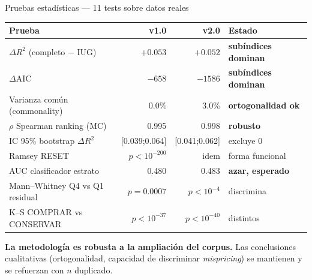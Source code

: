 \documentclass[aspectratio=169,11pt]{beamer}
\newcommand{\hi}[1]{\textcolor{inmuGreen}{\textbf{#1}}}
\begin{document}
\begin{frame}{Pruebas estadísticas --- 11 tests sobre datos reales}
  \footnotesize
  \begin{center}
  \begin{tabular}{lrrl}
    \toprule
    \textbf{Prueba} & \textbf{v1.0} & \textbf{v2.0} & \textbf{Estado} \\
    \midrule
    $\Delta R^2$ (completo $-$ IUG)            & $+0.053$ & $+0.052$ & \hi{subíndices dominan} \\
    $\Delta$AIC                                & $-658$   & $-1586$  & \hi{subíndices dominan} \\
    Varianza común (commonality)               & 0.0\%    & 3.0\%    & \hi{ortogonalidad ok} \\
    $\rho$ Spearman ranking (MC)               & 0.995    & 0.998    & \hi{robusto} \\
    IC 95\% bootstrap $\Delta R^2$             & [0.039;0.064] & [0.041;0.062] & excluye 0 \\
    Ramsey RESET                               & $p < 10^{-200}$ & idem & forma funcional \\
    AUC clasificador estrato                   & 0.480    & 0.483    & \hi{azar, esperado} \\
    Mann--Whitney Q4 vs Q1 residual            & $p=0.0007$ & $p<10^{-4}$ & discrimina \\
    K--S COMPRAR vs CONSERVAR                  & $p<10^{-37}$ & $p<10^{-40}$ & distintos \\
    \bottomrule
  \end{tabular}
  \end{center}
  \vspace{0.4em}
  \footnotesize
  \hi{La metodología es robusta a la ampliación del corpus.} Las
  conclusiones cualitativas (ortogonalidad, capacidad de discriminar
  \emph{mispricing}) se mantienen y se refuerzan con $n$ duplicado.
\end{frame}
\end{document}
